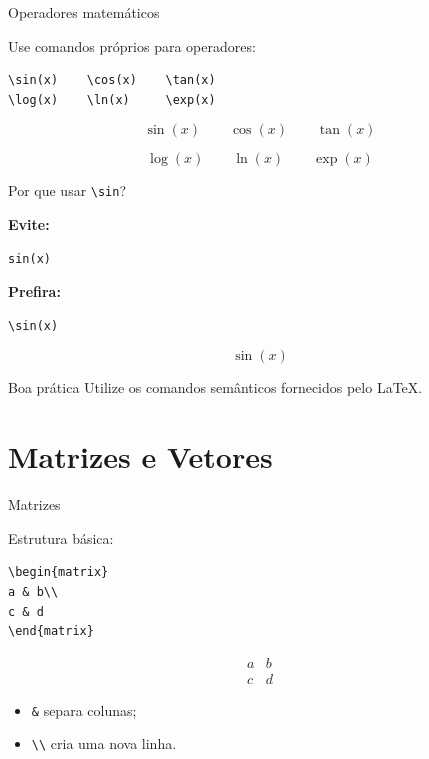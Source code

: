 \documentclass[aspectratio=169,xcolor=dvipsnames]{beamer}
\begin{document}
\begin{frame}[fragile]{Operadores matemáticos}

    Use comandos próprios para operadores:

\begin{lstlisting}
\sin(x)    \cos(x)    \tan(x)
\log(x)    \ln(x)     \exp(x)
\end{lstlisting}

    \[
        \sin(x)
        \qquad
        \cos(x)
        \qquad
        \tan(x)
    \]

    \[
        \log(x)
        \qquad
        \ln(x)
        \qquad
        \exp(x)
    \]

\end{frame}

\begin{frame}[fragile]{Por que usar \texttt{\textbackslash sin}?}

    \textbf{Evite:}

\begin{lstlisting}
sin(x)
\end{lstlisting}

    \textbf{Prefira:}

\begin{lstlisting}
\sin(x)
\end{lstlisting}

    \[
        \sin(x)
    \]

    \begin{alertblock}{Boa prática}
        Utilize os comandos semânticos fornecidos pelo LaTeX.
    \end{alertblock}

\end{frame}


\section{Matrizes e Vetores}

\begin{frame}[fragile]{Matrizes}

    Estrutura básica:

\begin{lstlisting}
\begin{matrix}
a & b\\
c & d
\end{matrix}
\end{lstlisting}

    \[
        \begin{matrix}
            a & b\\
            c & d
        \end{matrix}
    \]

    \begin{itemize}
        \item \texttt{\&} separa colunas;
        \item \texttt{\textbackslash\textbackslash} cria uma nova linha.
    \end{itemize}

\end{frame}
\end{document}
